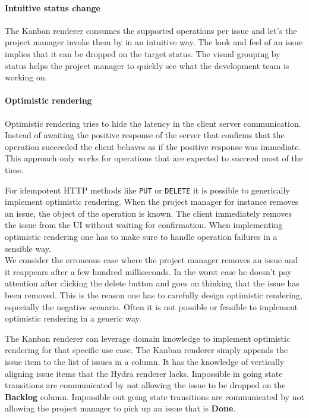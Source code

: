 \paragraph{Intuitive status change}
The Kanban renderer consumes the supported operations per issue and let's the project manager invoke them by in an intuitive way. The look and feel of an issue implies that it can be dropped on the target status. The visual grouping by status helps the project manager to quickly see what the development team is working on.

\paragraph{Optimistic rendering}
Optimistic rendering tries to hide the latency in the client server communication. Instead of awaiting the positive response of the server that confirms that the operation succeeded the client behaves as if the positive response was immediate. This approach only works for operations that are expected to succeed most of the time.

For idempotent HTTP methods like \lstinline{PUT} or \lstinline{DELETE} it is possible to generically implement optimistic rendering. When the project manager for instance removes an issue, the object of the operation is known. The client immediately removes the issue from the UI without waiting for confirmation. When implementing optimistic rendering one has to make sure to handle operation failures in a sensible way. \\
We consider the erroneous case where the project manager removes an issue and it reappears after a few hundred milliseconds. In the worst case he doesn't pay attention after clicking the delete button and goes on thinking that the issue has been removed. This is the reason one has to carefully design optimistic rendering, especially the negative scenario. Often it is not possible or feasible to implement optimistic rendering in a generic way.

The Kanban renderer can leverage domain knowledge to implement optimistic rendering for that specific use case. The Kanban renderer simply appends the issue item to the list of issues in a column. It has the knowledge of vertically aligning issue items that the Hydra renderer lacks. Impossible in going state transitions are communicated by not allowing the issue to be dropped on the \textbf{Backlog} column. Impossible out going state transitions are communicated by not allowing the project manager to pick up an issue that is \textbf{Done}.

